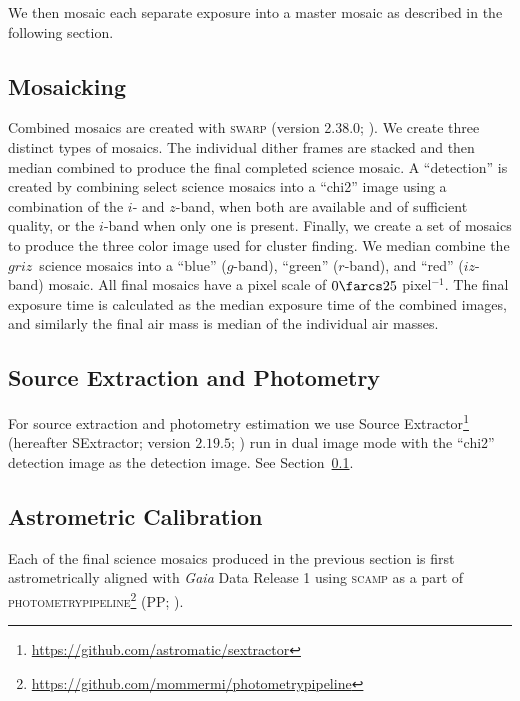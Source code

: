 \documentclass[apj, revtex4-1]{emulateapj}
\newcommand{\sdssg}{\hbox{$g$}}
\newcommand{\sdssr}{\hbox{$r$}}
\newcommand{\sdssi}{\hbox{$i$}}
\newcommand{\sdssz}{\hbox{$z$}}
\newcommand{\perpixel}{\hbox{pixel$^{-1}$}}
\begin{document}
We then mosaic each separate exposure into a master mosaic as described in the following section.

\subsection{Mosaicking}\label{sec:mosaicks}
Combined mosaics are created with \textsc{swarp} (version 2.38.0; \citealt{Bertin2002}). We create three distinct types of mosaics. The individual dither frames are stacked and then median combined to produce the final completed science mosaic. A ``detection'' is created by combining select science mosaics into a ``chi2'' image using a combination of the \sdssi- and \sdssz-band, when both are available and of sufficient quality, or the \sdssi-band when only one is present. Finally, we create a set of mosaics to produce the three color image used for cluster finding. We median combine the \sdssg\sdssr\sdssi\sdssz\ science mosaics into a ``blue'' (\sdssg-band), ``green'' (\sdssr-band), and ``red'' (\sdssi\sdssz-band) mosaic. All final mosaics have a pixel scale of $0\farcs25$ \perpixel. The final exposure time is calculated as the median exposure time of the combined images, and similarly the final air mass is median of the individual air masses.


\subsection{Source Extraction and Photometry}\label{sec:sextractor}
For source extraction and photometry estimation we use Source Extractor\footnote{\url{https://github.com/astromatic/sextractor}} (hereafter SExtractor; version $2.19.5$; \citealt{Bertin1996}) run in dual image mode with the ``chi2'' detection image as the detection image. See Section~\ref{sec:mosaicks}.


\subsection{Astrometric Calibration}
Each of the final science mosaics produced in the previous section is first astrometrically aligned with \textit{Gaia} \citep{GaiaCollaboration2016} Data Release 1 \citep{GaiaCollaboration2016a} using \textsc{scamp} \citep{Bertin2006} as a part of \textsc{photometrypipeline}\footnote{\url{https://github.com/mommermi/photometrypipeline}} (PP; \citealt{Mommert2017}).
\end{document}

